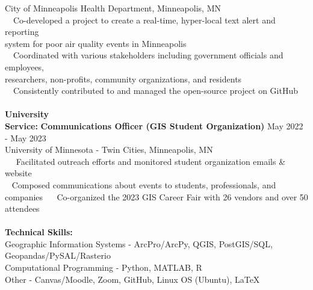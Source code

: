 \documentclass[letterpaper,12pt]{article}
\numberwithin{equation}{section}
\begin{document}
\hspace*{1.2in} City of Minneapolis Health Department, Minneapolis, MN \vspace*{.1cm} \\
\hspace*{1.2in} \textbullet ~~Co-developed a project to create a real-time, hyper-local text alert and reporting\\
\hspace*{1.6in} system for poor air quality events in Minneapolis
\\
\hspace*{1.2in} \textbullet ~~Coordinated with various stakeholders including government officials and employees, \\
\hspace*{1.6in} researchers, non-profits, community organizations, and residents \\
\hspace*{1.2in} \textbullet ~~Consistently contributed to and managed the open-source project on GitHub
\\\\
\noindent\textbf{University}\\
\noindent\textbf{Service:} \hspace*{.45in}\textbf{Communications Officer (GIS Student Organization)} \hspace*{.43in} May 2022 - May 2023\\
\hspace*{1.16in} University of Minnesota - Twin Cities, Minneapolis, MN \vspace*{.1cm}\\
\hspace*{1.2in} \textbullet ~~ Facilitated outreach efforts and monitored student organization emails \& website\\
\hspace*{1.2in} \textbullet ~ Composed communications about events to students, professionals, and companies
\hspace*{1.2in} \textbullet ~~ Co-organized the 2023 GIS Career Fair with 26 vendors and over 50 attendees
\\\\
\noindent\textbf{Technical Skills:}
\vspace*{.3cm} \\ Geographic Information Systems - ArcPro/ArcPy, QGIS, PostGIS/SQL, Geopandas/PySAL/Rasterio
\vspace*{.3cm} \\ Computational Programming - Python, MATLAB, R
\vspace*{.3cm} \\ Other - Canvas/Moodle, Zoom, GitHub, Linux OS (Ubuntu), \LaTeX
\end{document}
